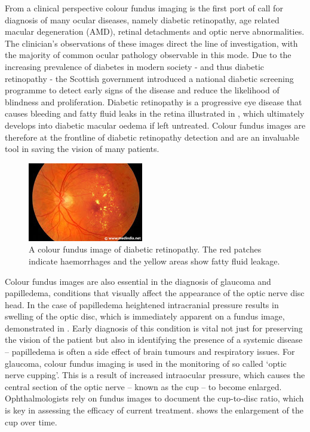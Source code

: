 From a clinical perspective colour fundus imaging is the first port of call
for diagnosis of many ocular diseases, namely diabetic retinopathy, age
related macular degeneration (AMD), retinal detachments and optic nerve abnormalities.\cite{3_medicine.uiowa.edu_2015} The clinician’s observations of these
images direct the line of investigation, with the majority of common
ocular pathology observable in this mode. Due to the increasing prevalence
of diabetes in modern society - and thus diabetic retinopathy - the Scottish
government introduced a national diabetic screening programme to detect early
signs of the disease and reduce the likelihood of blindness and proliferation.
Diabetic retinopathy is a progressive eye disease that causes bleeding and
fatty fluid leaks in the retina illustrated in , which ultimately
develops into diabetic macular oedema if left untreated. Colour fundus images
are therefore at the frontline of diabetic retinopathy detection and are an
invaluable tool in saving the vision of many patients.

\begin{figure}[htbp]
\centering
\includegraphics{figures/diabeticretinopathy}
\caption{A colour fundus image of diabetic retinopathy. The red patches indicate haemorrhages and the yellow areas show fatty fluid leakage.}
\label{fig:dr}
   \end{figure}

Colour fundus images are also essential in the diagnosis of glaucoma and
papilledema, conditions that visually affect the appearance of the optic
nerve disc head.  In the case of papilledema heightened intracranial pressure
results in swelling of the optic disc, which is immediately apparent on a
fundus image, demonstrated in . Early diagnosis of this condition
is vital not just for preserving the vision of the patient but also in identifying
the presence of a systemic disease – papilledema is often a side effect of brain
tumours and respiratory issues. For glaucoma, colour fundus imaging is used in
the monitoring of so called ‘optic nerve cupping’. This is a result of increased
intraocular pressure, which causes the central section of the optic nerve – known
as the cup – to become enlarged. Ophthalmologists rely on fundus images to document
the cup-to-disc ratio, which is key in assessing the efficacy of current treatment.
 shows the enlargement of the cup over time.


